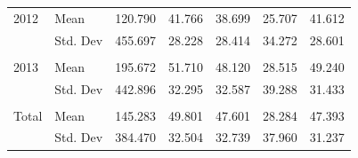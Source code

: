 \documentclass[11pt,a4paper,oneside]{article}
\begin{document}
\begin{table}
\begin{tabular}{llccccc}
2012  & Mean     & 120.790            & 41.766     & 38.699                             & 25.707                     & 41.612                             \\
      & Std. Dev & 455.697            & 28.228     & 28.414                             & 34.272                     & 28.601                             \\
      &          &                    &            &                                    &                            &                                    \\
2013  & Mean     & 195.672            & 51.710     & 48.120                             & 28.515                     & 49.240                             \\
      & Std. Dev & 442.896            & 32.295     & 32.587                             & 39.288                     & 31.433                             \\
      &          &                    &            &                                    &                            &                                    \\
Total & Mean     & 145.283            & 49.801     & 47.601                             & 28.284                     & 47.393                             \\
      & Std. Dev & 384.470            & 32.504     & 32.739                             & 37.960                     & 31.237                            \\
\bottomrule
\end{tabular}
\end{table}

\vspace*{\fill}
\end{document}
